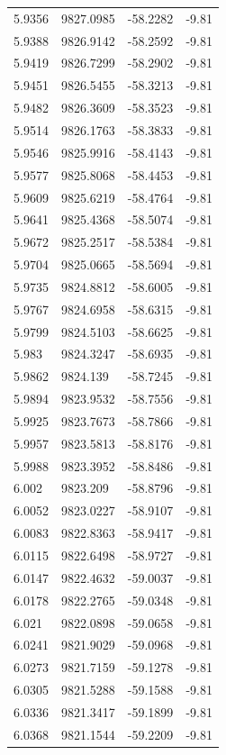 \begin{table}[H]
\begin{tabular}{llll}
5.9356 & 9827.0985 & -58.2282 & -9.81 \\
5.9388 & 9826.9142 & -58.2592 & -9.81 \\
5.9419 & 9826.7299 & -58.2902 & -9.81 \\
5.9451 & 9826.5455 & -58.3213 & -9.81 \\
5.9482 & 9826.3609 & -58.3523 & -9.81 \\
5.9514 & 9826.1763 & -58.3833 & -9.81 \\
5.9546 & 9825.9916 & -58.4143 & -9.81 \\
5.9577 & 9825.8068 & -58.4453 & -9.81 \\
5.9609 & 9825.6219 & -58.4764 & -9.81 \\
5.9641 & 9825.4368 & -58.5074 & -9.81 \\
5.9672 & 9825.2517 & -58.5384 & -9.81 \\
5.9704 & 9825.0665 & -58.5694 & -9.81 \\
5.9735 & 9824.8812 & -58.6005 & -9.81 \\
5.9767 & 9824.6958 & -58.6315 & -9.81 \\
5.9799 & 9824.5103 & -58.6625 & -9.81 \\
5.983 & 9824.3247 & -58.6935 & -9.81 \\
5.9862 & 9824.139 & -58.7245 & -9.81 \\
5.9894 & 9823.9532 & -58.7556 & -9.81 \\
5.9925 & 9823.7673 & -58.7866 & -9.81 \\
5.9957 & 9823.5813 & -58.8176 & -9.81 \\
5.9988 & 9823.3952 & -58.8486 & -9.81 \\
6.002 & 9823.209 & -58.8796 & -9.81 \\
6.0052 & 9823.0227 & -58.9107 & -9.81 \\
6.0083 & 9822.8363 & -58.9417 & -9.81 \\
6.0115 & 9822.6498 & -58.9727 & -9.81 \\
6.0147 & 9822.4632 & -59.0037 & -9.81 \\
6.0178 & 9822.2765 & -59.0348 & -9.81 \\
6.021 & 9822.0898 & -59.0658 & -9.81 \\
6.0241 & 9821.9029 & -59.0968 & -9.81 \\
6.0273 & 9821.7159 & -59.1278 & -9.81 \\
6.0305 & 9821.5288 & -59.1588 & -9.81 \\
6.0336 & 9821.3417 & -59.1899 & -9.81 \\
6.0368 & 9821.1544 & -59.2209 & -9.81 \\

\end{tabular}
\end{table}
